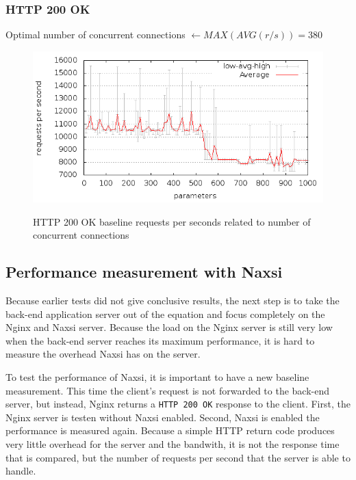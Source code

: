 \documentclass[Measurements]{subfiles}
\begin{document}
\subsubsection{HTTP 200 OK}

Optimal number of concurrent connections $ \leftarrow MAX(AVG(r/s)) = 380$

\begin{figure}[H]
\caption{HTTP 200 OK baseline requests per seconds related to number of concurrent connections}
\centering
\includegraphics[scale=0.55] {images/results/baseline_200/output.png}
\label{fig:Baseline performance measurement}
\end{figure}

\subsection{Performance measurement with Naxsi}
Because earlier tests did not give conclusive results, the next step is to take the back-end application server out of the equation and focus completely on the Nginx and Naxsi server. Because the load on the Nginx server is still very low when the back-end server reaches its maximum performance, it is hard to measure the overhead Naxsi has on the server.

To test the performance of Naxsi, it is important to have a new baseline measurement. This time the client's request is not forwarded to the back-end server, but instead, Nginx returns a \verb+HTTP 200 OK+ response to the client. First, the Nginx server is testen without Naxsi enabled. Second, Naxsi is enabled the performance is measured again. Because a simple HTTP return code produces very little overhead for the server and the bandwith, it is not the response time that is compared, but the number of requests per second that the server is able to handle.
\end{document}
